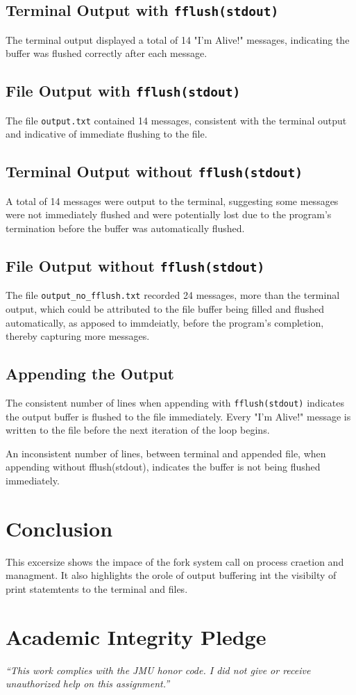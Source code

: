 \documentclass[12pt]{article}
\begin{document}
\subsection{Terminal Output with \texttt{fflush(stdout)}}
The terminal output displayed a total of 14 "I'm Alive!" messages, indicating the buffer was flushed correctly after each message.

\subsection{File Output with \texttt{fflush(stdout)}}
The file \texttt{output.txt} contained 14 messages, consistent with the terminal output and indicative of immediate flushing to the file.

\subsection{Terminal Output without \texttt{fflush(stdout)}}
A total of 14 messages were output to the terminal, suggesting some messages were not immediately flushed and were potentially lost due to the program's termination before the buffer was automatically flushed.

\subsection{File Output without \texttt{fflush(stdout)}}
The file \texttt{output\_no\_fflush.txt} recorded 24 messages, more than the terminal output, which could be attributed to the file buffer being filled and flushed automatically, as apposed to immdeiatly, before the program's completion, thereby capturing more messages.

\subsection{Appending the Output}
The consistent number of lines when appending with \texttt{fflush(stdout)} indicates the output buffer is flushed to the file immediately. Every "I'm Alive!" message is written to the file before the next iteration of the loop begins. 

An inconsistent number of lines, between terminal and appended file, when appending without fflush(stdout), indicates the buffer is not being flushed immediately. 

\section{Conclusion}
This excersize shows the impace of the fork system call on process craetion and managment. It also highlights the orole of output buffering int the visibilty of print statemtents to the terminal and files. 

\vfill
  \section*{Academic Integrity Pledge}
    {\color{red}\textit{“This work complies with the JMU honor code. I did not give or receive unauthorized help on this assignment.”}}
\end{document}
